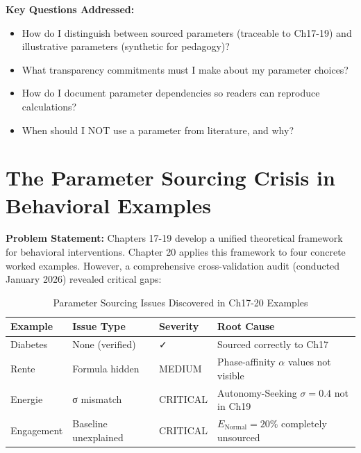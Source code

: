 \textbf{Key Questions Addressed:}
\begin{itemize}[nosep]
\item How do I distinguish between sourced parameters (traceable to Ch17-19) and illustrative parameters (synthetic for pedagogy)?
\item What transparency commitments must I make about my parameter choices?
\item How do I document parameter dependencies so readers can reproduce calculations?
\item When should I NOT use a parameter from literature, and why?
\end{itemize}


\section{The Parameter Sourcing Crisis in Behavioral Examples}
\label{sec:jjj-motivation}

\textbf{Problem Statement:} Chapters 17-19 develop a unified theoretical framework for behavioral interventions. Chapter 20 applies this framework to four concrete worked examples. However, a comprehensive cross-validation audit (conducted January 2026) revealed critical gaps:

\begin{table}[htbp]
\centering
\caption{Parameter Sourcing Issues Discovered in Ch17-20 Examples}
\label{tab:jjj-issues}
\renewcommand{\arraystretch}{1.3}
\small
\begin{tabular}{@{}lllp{3cm}@{}}
\toprule
\textbf{Example} & \textbf{Issue Type} & \textbf{Severity} & \textbf{Root Cause} \\
\midrule
Diabetes & None (verified) & ✓ & Sourced correctly to Ch17 \\
Rente & Formula hidden & MEDIUM & Phase-affinity $\alpha$ values not visible \\
Energie & σ mismatch & CRITICAL & Autonomy-Seeking $\sigma = 0.4$ not in Ch19 \\
Engagement & Baseline unexplained & CRITICAL & $E_{\text{Normal}} = 20\%$ completely unsourced \\
\bottomrule
\end{tabular}
\end{table}

